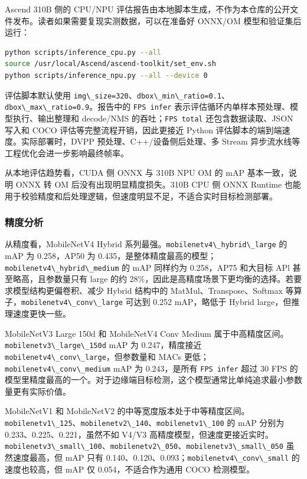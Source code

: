 Ascend 310B 侧的 CPU/NPU
评估报告由本地脚本生成，不作为本仓库的公开文件发布。读者如果需要复现实测数据，可以在准备好
ONNX/OM 模型和验证集后运行：

\begin{lstlisting}[language=bash]
python scripts/inference_cpu.py --all
source /usr/local/Ascend/ascend-toolkit/set_env.sh
python scripts/inference_npu.py --all --device 0
\end{lstlisting}

评估脚本默认使用
\passthrough{\lstinline!img\_size=320!}、\passthrough{\lstinline!dbox\_min\_ratio=0.1!}、\passthrough{\lstinline!dbox\_max\_ratio=0.9!}。报告中的
\passthrough{\lstinline!FPS infer!}
表示评估循环内单样本预处理、模型执行、输出整理和 decode/NMS
的吞吐；\passthrough{\lstinline!FPS total!} 还包含数据读取、JSON 写入和
COCO 评估等完整流程开销，因此更接近 Python
评估脚本的端到端速度。实际部署时，DVPP 预处理、C++/设备侧后处理、多
Stream 异步流水线等工程优化会进一步影响最终帧率。

从本地评估趋势看，CUDA 侧 ONNX 与 310B NPU OM 的 mAP 基本一致，说明 ONNX
转 OM 后没有出现明显精度损失。310B CPU 侧 ONNX Runtime
也能用于校验精度和后处理逻辑，但速度明显不足，不适合实时目标检测部署。

\subsubsection{精度分析}\label{ux7cbeux5ea6ux5206ux6790}

从精度看，MobileNetV4 Hybrid
系列最强。\passthrough{\lstinline!mobilenetv4\_hybrid\_large!} 的 mAP 为
0.258，AP50 为
0.435，是整体精度最高的模型；\passthrough{\lstinline!mobilenetv4\_hybrid\_medium!}
的 mAP 同样约为 0.258，AP75 和大目标 APl 甚至略高，且参数量只有 large
的约 28\%，因此是高精度场景下更均衡的选择。若要求模型结构更偏卷积、减少
Hybrid 结构中的 MatMul、Transpose、Softmax
等算子，\passthrough{\lstinline!mobilenetv4\_conv\_large!} 可达到 0.252
mAP，略低于 Hybrid large，但推理速度更快一些。

MobileNetV3 Large 150d 和 MobileNetV4 Conv Medium
属于中高精度区间。\passthrough{\lstinline!mobilenetv3\_large\_150d!} mAP
为 0.247，精度接近
\passthrough{\lstinline!mobilenetv4\_conv\_large!}，但参数量和 MACs
更低；\passthrough{\lstinline!mobilenetv4\_conv\_medium!} mAP 为
0.243，是所有 \passthrough{\lstinline!FPS infer!} 超过 30 FPS
的模型里精度最高的一个。对于边缘端目标检测，这个模型通常比单纯追求最小参数量更有实际价值。

MobileNetV1 和 MobileNetV2
的中等宽度版本处于中等精度区间。\passthrough{\lstinline!mobilenetv1\_125!}、\passthrough{\lstinline!mobilenetv2\_140!}、\passthrough{\lstinline!mobilenetv1\_100!}
的 mAP 分别为 0.233、0.225、0.221，虽然不如 V4/V3
高精度模型，但速度更接近实时。\passthrough{\lstinline!mobilenetv3\_small\_100!}、\passthrough{\lstinline!mobilenetv2\_050!}、\passthrough{\lstinline!mobilenetv3\_small\_050!}
虽然速度最高，但 mAP 只有
0.140、0.120、0.093；\passthrough{\lstinline!mobilenetv4\_conv\_small!}
的速度也较高，但 mAP 仅 0.054，不适合作为通用 COCO 检测模型。

